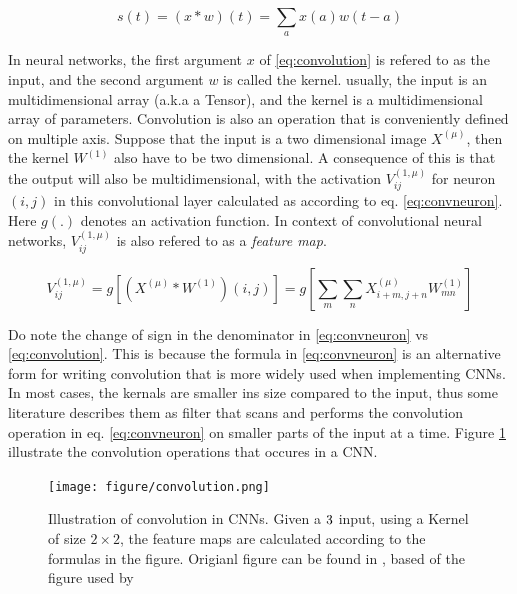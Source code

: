 \begin{equation}
    \label{eq:convolution}
    s(t) = (x * w)(t) = \sum_a x(a)w(t-a)
\end{equation}

In neural networks, the first argument $x$ of \eqref{eq:convolution} is refered to as the input, and the second argument $w$ is called the kernel. usually, the input is an multidimensional array (a.k.a a Tensor), and the kernel is a multidimensional array of parameters. Convolution is also an operation that is conveniently defined on multiple axis. Suppose that the input is a two dimensional image $X^{(\mu)}$, then the kernel $W^{(1)}$ also have to be two dimensional. A consequence of this is that the output will also be multidimensional, with the activation $V^{(1,\mu)}_{ij}$ for neuron $(i,j)$ in this convolutional layer calculated as according to eq. \eqref{eq:convneuron}. Here $g(.)$ denotes an activation function. In context of convolutional neural networks, $V^{(1,\mu)}_{ij}$ is also refered to as a \textit{feature map}\cite{mehligcourseslides}.

\begin{equation}
    \label{eq:convneuron}
    V^{(1,\mu)}_{ij} = g\left[(X^{(\mu)} * W^{(1)})(i,j)\right] = g\left[\sum_m\sum_n X^{(\mu)}_{i+m,j+n} W^{(1)}_{mn}\right]
\end{equation}

Do note the change of sign in the denominator in \eqref{eq:convneuron} vs \eqref{eq:convolution}. This is because the formula in \eqref{eq:convneuron} is an alternative form for writing convolution that is more widely used when implementing CNNs\cite{Goodfellow-et-al-2016}. In most cases, the kernals are smaller ins size compared to the input, thus some literature describes them as filter that scans and performs the convolution operation in eq. \eqref{eq:convneuron} on smaller parts of the input at a time. Figure \ref{fig:convolution} illustrate the convolution operations that occures in a CNN.

\begin{figure}
    \centering
    \texttt{[image: figure/convolution.png]}
    \caption{Illustration of convolution in CNNs. Given a $3\time3$ input, using a Kernel of size $2\times 2$, the feature maps are calculated according to the formulas in the figure. Origianl figure can be found in \cite{barkdeep}, based of the figure used by \cite{Goodfellow-et-al-2016}}
    \label{fig:convolution}
\end{figure}

